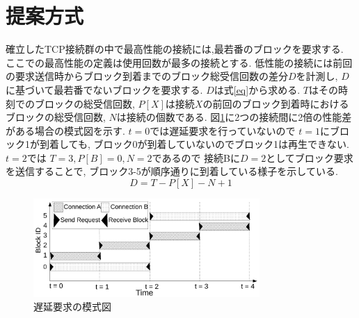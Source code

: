 \documentclass{ltjsarticle}
\begin{document}
\section{提案方式}
\vspace{-2.75mm}
確立したTCP接続群の中で最高性能の接続には,最若番のブロックを要求する.
ここでの最高性能の定義は使用回数が最多の接続とする.
低性能の接続には前回の要求送信時からブロック到着までのブロック総受信回数の差分\begin{math}D\end{math}を計測し,
\begin{math}D\end{math}に基づいて最若番でないブロックを要求する.
\begin{math}D\end{math}は式\ref{eq}から求める.
\begin{math}T\end{math}はその時刻でのブロックの総受信回数,
\begin{math}P[X]\end{math}は接続\begin{math}X\end{math}の前回のブロック到着時におけるブロックの総受信回数,
\begin{math}N\end{math}は接続の個数である.
図\ref{delay}に2つの接続間に2倍の性能差がある場合の模式図を示す.
\begin{math}t=0\end{math}では遅延要求を行っていないので
\begin{math}t=1\end{math}にブロック1が到着しても,
ブロック0が到着していないのでブロック1は再生できない.
\begin{math}t=2\end{math}では
\begin{math}T=3, P[B]=0, N=2\end{math}であるので
接続Bに\begin{math}D=2\end{math}としてブロック要求を送信することで,
ブロック3-5が順序通りに到着している様子を示している.
\vspace{-2.75mm}
\begin{equation}
	\label{eq}
	D = T - P[X] - N + 1
\end{equation}
\vspace{-7.75mm}
\begin{figure}[h]
	\centering
	\includegraphics[width=8.6cm]{figure/delay.pdf}
	\vspace{-3mm}
	\caption{遅延要求の模式図}
	\label{delay}
\end{figure}
\vspace{-12mm}
\end{document}
